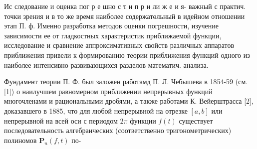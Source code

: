 \documentclass[10pt]{article}
\begin{document}
Ис следование и оценка пог р е шно с т и п р и ли ж е и я- важный с практич. точки зрения и в то же время наиболее содержатөльный в идейном отношении этап П. ф. Именно разработка методов оценки погрешности, изучение зависимости ее от гладкостных характеристик приближаемой функции, исследование и сравнение аппроксимативных свойств различных аппаратов приближения привели к формированию теории приближения функций одного из наиболее интенсивно развивающихся разделов математич. анализа.



Фундамент теории П. Ф. был заложен работамд П. Л. Чебышева в 1854-59 (см. [1]) о наилучшем равномерном приближении непрерывных функций многочленами и рациональными дробями, а также работами К. Вейерштрасса [2], доказавшего в 1885, что для любой непрерывной на отрезке $[a, b]$ или непрерывной на всей оси с периодом $2 \pi$ функции $f(t)$ существует последовательность алгебраических (соответственно тригонометрических) полиномов $\boldsymbol{P}_{n}(f, t)$ по-
\end{document}
